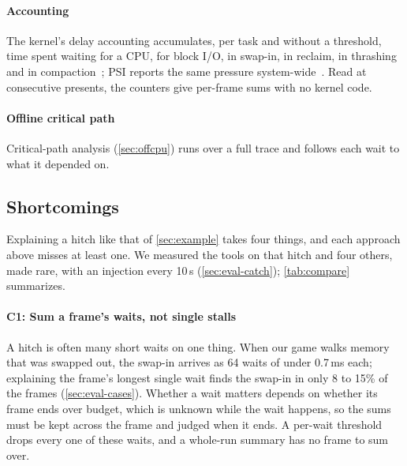 \paragraph{Accounting} The kernel's delay accounting accumulates, per task and
without a threshold, time spent waiting for a CPU, for block I/O, in
swap-in, in reclaim, in thrashing and in compaction~\cite{delayacct}; PSI
reports the same pressure system-wide~\cite{psi}. Read at consecutive
presents, the counters give per-frame sums with no kernel code.

\paragraph{Offline critical path} Critical-path
analysis (\autoref{sec:offcpu}) runs over a full trace and follows each
wait to what it depended on.

\subsection{Shortcomings}
\label{sec:challenges}
\label{sec:limits}

Explaining a hitch like that of \autoref{sec:example} takes four things,
and each approach above misses at least one. We measured the tools on that
hitch and four others, made rare, with an injection every 10\,s
(\autoref{sec:eval-catch}); \autoref{tab:compare} summarizes.

\paragraph{C1: Sum a frame's waits, not single stalls} A hitch is often many
short waits on one thing. When our game walks memory that was swapped out,
the swap-in arrives as 64 waits of under 0.7\,ms each; explaining the
frame's longest single wait finds the swap-in in only 8 to 15\% of the
frames (\autoref{sec:eval-cases}). Whether a wait matters depends on
whether its frame ends over budget, which is unknown while the wait
happens, so the sums must be kept across the frame and judged when it ends.
A per-wait threshold drops every one of these waits, and a whole-run
summary has no frame to sum over.

